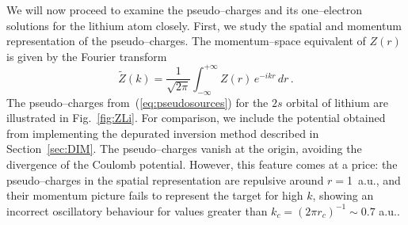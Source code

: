 \documentclass[10pt]{article}
\begin{document}
We will now proceed to examine the pseudo--charges and its 
one--electron solutions for the lithium atom closely. First, we study 
the spatial and momentum representation of the pseudo--charges. The 
momentum--space equivalent of $Z(r)$ is given by the Fourier 
transform
\begin{equation}
 \widetilde{Z}(k) = \frac{1}{\sqrt{2\pi}} \int_{-\infty}^{+\infty} 
 Z(r)\,e^{-ikr}\,dr\,.
\end{equation}
The pseudo--charges from~(\ref{eq:pseudosources}) for the $2s$ 
orbital of lithium are illustrated in Fig.~\ref{fig:ZLi}. For 
comparison, we include the potential obtained from implementing the 
depurated inversion method described in Section~\ref{sec:DIM}. The 
pseudo--charges vanish at the origin, avoiding the divergence of the 
Coulomb potential. However, this feature comes at a price: the 
pseudo--charges in the spatial representation are repulsive around 
\mbox{$r= $1 a.u.}, and their momentum picture fails to represent the 
target for high $k$, showing an incorrect oscillatory behaviour for 
values greater than $k_c=(2\pi r_c)^{-1}\sim0.7$ a.u..
\end{document}
